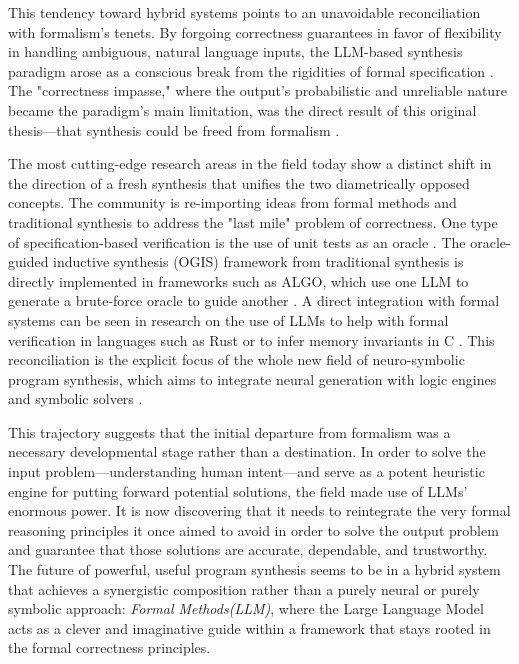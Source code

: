 \documentclass[12pt, a4paper]{report}
\begin{document}
This tendency toward hybrid systems points to an unavoidable reconciliation with formalism's tenets. By forgoing correctness guarantees in favor of flexibility in handling ambiguous, natural language inputs, the LLM-based synthesis paradigm arose as a conscious break from the rigidities of formal specification \citep{gulwani2017program}. The "correctness impasse," where the output's probabilistic and unreliable nature became the paradigm's main limitation, was the direct result of this original thesis—that synthesis could be freed from formalism \citep{manna1980theory}.

The most cutting-edge research areas in the field today show a distinct shift in the direction of a fresh synthesis that unifies the two diametrically opposed concepts. The community is re-importing ideas from formal methods and traditional synthesis to address the "last mile" problem of correctness. One type of specification-based verification is the use of unit tests as an oracle \citep{li2022competition}. The oracle-guided inductive synthesis (OGIS) framework from traditional synthesis is directly implemented in frameworks such as ALGO, which use one LLM to generate a brute-force oracle to guide another \citep{zhang2024algo}. A direct integration with formal systems can be seen in research on the use of LLMs to help with formal verification in languages such as Rust or to infer memory invariants in C \citep{shi2023don}. This reconciliation is the explicit focus of the whole new field of neuro-symbolic program synthesis, which aims to integrate neural generation with logic engines and symbolic solvers \citep{pan2023logic}.

This trajectory suggests that the initial departure from formalism was a necessary developmental stage rather than a destination. In order to solve the input problem—understanding human intent—and serve as a potent heuristic engine for putting forward potential solutions, the field made use of LLMs' enormous power. It is now discovering that it needs to reintegrate the very formal reasoning principles it once aimed to avoid in order to solve the output problem and guarantee that those solutions are accurate, dependable, and trustworthy. The future of powerful, useful program synthesis seems to be in a hybrid system that achieves a synergistic composition rather than a purely neural or purely symbolic approach: \textit{Formal Methods(LLM)}, where the Large Language Model acts as a clever and imaginative guide within a framework that stays rooted in the formal correctness principles.
\end{document}
